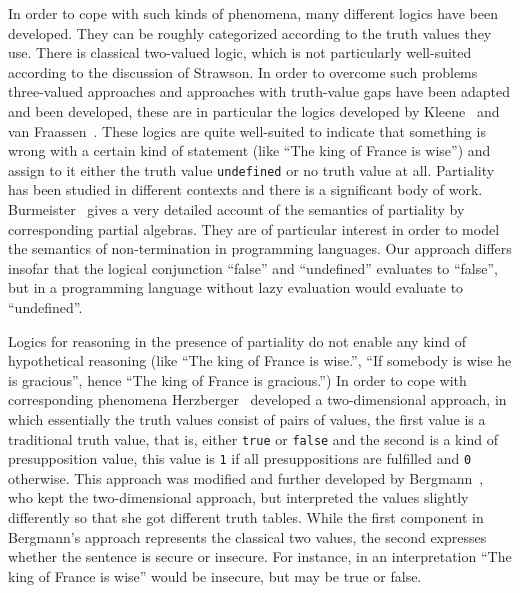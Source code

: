 \documentclass{\filespath jancl}
\begin{document}
In order to cope with such kinds of phenomena, many different logics
have been developed.  They can be roughly categorized according to the
truth values they use. There is classical two-valued logic, which is
not particularly well-suited according to the discussion of Strawson.
In order to overcome such problems three-valued approaches and
approaches with truth-value gaps have been adapted and been developed,
these are in particular the logics developed by Kleene~\cite{Kleene52}
and van Fraassen~\cite{Fraassen66}.  These logics are quite
well-suited to indicate that something is wrong with a certain kind of
statement (like ``The king of France is wise'') and assign to it
either the truth value {\tt undefined} or no truth value at
all. Partiality has been studied in different contexts and there is a
significant body of work. Burmeister~\cite{Burmeister86} gives a very
detailed account of the semantics of partiality by
corresponding partial algebras. They are of particular
interest in order to model the semantics of non-termination in
programming languages. Our approach differs insofar that the logical
conjunction ``false'' and ``undefined'' evaluates to ``false'', but in
a programming language without lazy evaluation would evaluate to
``undefined''.

Logics for reasoning in the presence of partiality do not
enable any kind of hypothetical reasoning (like ``The king of France
is wise.'', ``If somebody is wise he is gracious'', hence ``The king
of France is gracious.'')  In order to cope with corresponding
phenomena Herzberger~\cite{Herzberger73} developed a two-dimensional
approach, in which essentially the truth values consist of pairs of
values, the first value is a traditional truth value, that is, either
{\tt true} or {\tt false} and the second is a kind of presupposition
value, this value is {\tt 1} if all presuppositions are fulfilled and
{\tt 0} otherwise.  This approach was modified and further developed
by Bergmann~\cite{Bergmann:patdl81}, who kept the two-dimensional
approach, but interpreted the values slightly differently so that she
got different truth tables.  While the first component in Bergmann's
approach represents the classical two values, the second expresses
whether the sentence is secure or insecure.  For instance, in an
interpretation ``The king of France is wise'' would be insecure, but
may be true or false.
\end{document}
